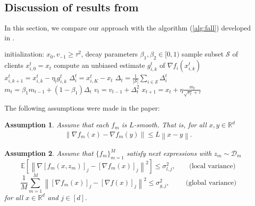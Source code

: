 \documentclass[sn-mathphys,Numbered]{sn-jnl}%
\newtheorem{assumption}{Assumption}
\newcommand*{\R}{{\mathbb R}}
\renewcommand{\|}{\parallel}
\newcommand{\norm}[1]{\left\lVert#1\right\rVert}
\newcommand{\sqn}[1]{{\left\lVert#1\right\rVert}^2}
\newcommand{\D}{\mathcal{D}}
\renewcommand {\*} {\ast}
\def\R{\mathbb{R}}
\begin{document}
\begin{itemize}
 
\end{itemize}






\subsection{Discussion of results from \cite{reddi2020adaptive}}\label{fedavg}


In this section, we compare our approach with the algorithm (\cref{alg:fall}) developed in \cite{reddi2020adaptive}.
\begin{algorithm*}
    \caption{FedAdaGrad}\label{alg:fall}
\begin{algorithmic}[1]
\STATE initialization: $x_0, v_{-1} \geq \tau^2$, decay parameters $\beta_1, \beta_2 \in [0,1)$
    \STATE sample subset $\mathcal{S}$ of clients
    \STATE $x^t_{i,0} = x_{t}$
            \STATE compute an unbiased estimate $g_{i,k}^t$ of $\nabla f_i(x^t_{i,k})$
            \STATE $x_{i,k+1}^t = x_{i, k}^t - \eta_l g_{i,k}^t$
        \ENDFOR
        \STATE $\Delta_i^t = x^t_{i, K} - x_{t}$
    \ENDFOR
    \STATE $\Delta_t = \frac{1}{|\mathcal{S}|} \sum_{i \in \mathcal{S}} \Delta_i^t$
    \STATE $m_t = \beta_1m_{t-1} + (1-\beta_1)\Delta_t$
    \STATE $v_t = v_{t-1} + \Delta_{t}^2$
    \STATE $x_{t+1} = x_{t} + \eta \frac{m_t}{\sqrt{v_t} + \tau}$
\ENDFOR
\end{algorithmic}
\end{algorithm*}
The following assumptions were made in the paper:
\begin{assumption}
\label{asp:lipschitz}
Assume that each $f_m$ is $L$-smooth. That is, for all $x, y \in \R^d$
\begin{align*}
    \norm{\nabla f_m(x) - \nabla f_m(y)} \leq L \norm{x - y}.
\end{align*}
\end{assumption} 

\begin{assumption}
\label{asp:variance}
Assume that $\{f_m\}_{m=1}^M$ satisfy next expressions with $z_m \sim \D_m$ 
$$\mathbb{E}[\sqn{\nabla [f_m(x,z_m)]_j - [\nabla f_m(x)]_j}] \leq \sigma_{l,j}^2, \qquad \text{(local variance)}$$
$$\frac{1}{M} \sum_{m=1}^M \sqn{[\nabla f_m(x)]_j - [\nabla f(x)]_j} \leq \sigma_{g,j}^2, \qquad \text{ (global variance)}$$ 
for all $x \in \mathbb{R}^d$ and $j \in [d]$.
\end{assumption}
\end{document}
